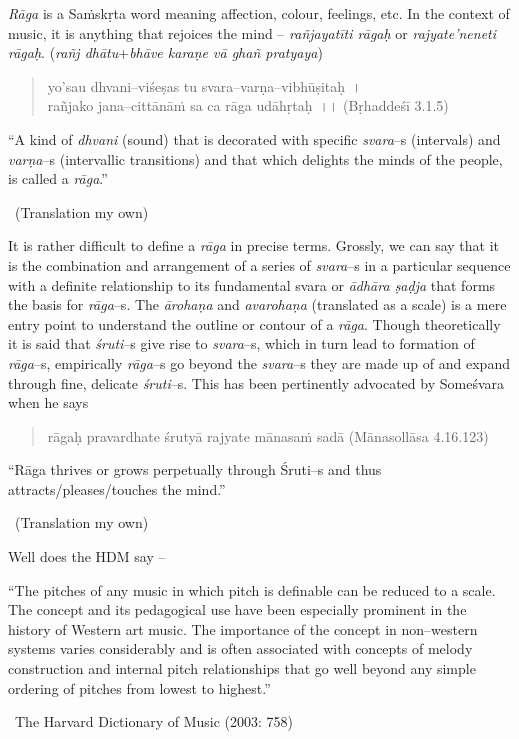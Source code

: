 \textit{Rāga} is a Saṁskṛta word meaning affection, colour, feelings, etc. In the context of music, it is anything that rejoices the mind – \textit{rañjayatīti rāgaḥ} or \textit{rajyate’neneti rāgaḥ}. (\textit{rañj dhātu}+\textit{bhāve karaṇe vā ghañ pratyaya})

\begin{verse}
yo’sau dhvani–viśeṣas tu svara–varṇa–vibhūṣitaḥ~।\\ rañjako jana–cittānāṁ sa ca rāga udāhṛtaḥ~।। (Bṛhaddeśī 3.1.5)
\end{verse}

\begin{myquote}
“A kind of \textit{dhvani} (sound) that is decorated with specific \textit{svara}–s (intervals) and \textit{varṇa}–s (intervallic transitions) and that which delights the minds of the people, is called a \textit{rāga}.” 

~\hfill (Translation my own)
\end{myquote}

It is rather difficult to define a \textit{rāga} in precise terms. Grossly, we can say that it is the combination and arrangement of a series of \textit{svara}–s in a particular sequence with a definite relationship to its fundamental svara or \textit{ādhāra ṣaḍja} that forms the basis for \textit{rāga}–s. The \textit{ārohaṇa} and \textit{avarohaṇa} (translated as a scale) is a mere entry point to understand the outline or contour of a \textit{rāga}. Though theoretically it is said that \textit{śruti}–s give rise to \textit{svara}–s, which in turn lead to formation of \textit{rāga}–s, empirically \textit{rāga}–s go beyond the \textit{svara}–s they are made up of and expand through fine, delicate \textit{śruti}–s. This has been pertinently advocated by Someśvara when he says

\begin{verse}
rāgaḥ pravardhate śrutyā rajyate mānasaṁ sadā (Mānasollāsa 4.16.123)
\end{verse}

\begin{myquote}
“Rāga thrives or grows perpetually through Śruti–s and thus attracts/pleases/touches the mind.” 

~\hfill (Translation my own)
\end{myquote}

Well does the HDM say –

\begin{myquote}
“The pitches of any music in which pitch is definable can be reduced to a scale. The concept and its pedagogical use have been especially prominent in the history of Western art music. The importance of the concept in non–western systems varies considerably and is often associated with concepts of melody construction and internal pitch relationships that go well beyond any simple ordering of pitches from lowest to highest.” 

~\hfill The Harvard Dictionary of Music (2003: 758)
\end{myquote}

